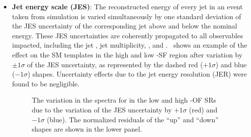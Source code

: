 \begin{itemize}
  \item \textbf{Jet energy scale (JES)}: The reconstructed energy of every jet in an event taken from simulation is varied simultaneously by one standard deviation of the JES uncertainty of the corresponding jet above and below the nominal energy. These JES uncertainties are coherently propagated to all observables impacted, including the jet \pt, jet multiplicity, \ptmiss, and \mttll.~ shows an example of the effect on the SM \ttll \MET templates in the high and low \mttll-SF region after variation by $\pm1\sigma$ of the JES uncertainty, as represented by the dashed red ($+1\sigma$) and blue ($-1\sigma$) shapes. Uncertainty effects due to the jet energy resolution (JER) were found to be negligible.

    \begin{figure}[h]
      \centering
      \caption{The variation in the \ptmiss spectra for \ttll in the low and high \mttll-OF SRs due to the variation of the JES uncertainty by $+1\sigma$ (red) and $-1\sigma$ (blue). The normalized residuals of the ``up'' and ``down'' shapes are shown in the lower panel.}
      \label{fig:JESshape}
    \end{figure}


\end{itemize}
